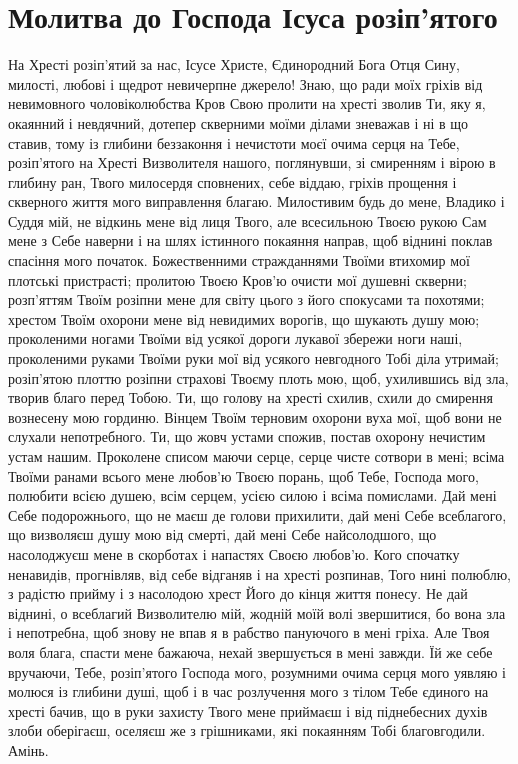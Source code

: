 \documentclass[chapters.tex]{subfiles}
\begin{document}
\section{Молитва до Господа Ісуса розіп’ятого}
На Хресті розіп’ятий за нас, Ісусе Христе, Єдинородний Бога Отця Сину, милості, любові і щедрот невичерпне джерело! Знаю, що ради моїх гріхів від невимовного чоловіколюбства Кров Свою пролити на хресті зволив Ти, яку я, окаянний і невдячний, дотепер скверними моїми ділами зневажав і ні в що ставив, тому із глибини беззаконня і нечистоти моєї очима серця на Тебе, розіп’ятого на Хресті Визволителя нашого, поглянувши, зі смиренням і вірою в глибину ран, Твого милосердя сповнених, себе віддаю, гріхів прощення і скверного життя мого виправлення благаю. Милостивим будь до мене, Владико і Суддя мій, не відкинь мене від лиця Твого, але всесильною Твоєю рукою Сам мене з Себе наверни і на шлях істинного покаяння направ, щоб віднині поклав спасіння мого початок. Божественними стражданнями Твоїми втихомир мої плотські пристрасті; пролитою Твоєю Кров’ю очисти мої душевні скверни; розп’яттям Твоїм розіпни мене для світу цього з його спокусами та похотями; хрестом Твоїм охорони мене від невидимих ворогів, що шукають душу мою; проколеними ногами Твоїми від усякої дороги лукавої збережи ноги наші, проколеними руками Твоїми руки мої від усякого невгодного Тобі діла утримай; розіп’ятою плоттю розіпни страхові Твоєму плоть мою, щоб, ухилившись від зла, творив благо перед Тобою. Ти, що голову на хресті схилив, схили до смирення вознесену мою гординю. Вінцем Твоїм терновим охорони вуха мої, щоб вони не слухали непотребного. Ти, що жовч устами спожив, постав охорону нечистим устам нашим. Проколене списом маючи серце, серце чисте сотвори в мені; всіма Твоїми ранами всього мене любов’ю Твоєю порань, щоб Тебе, Господа мого, полюбити всією душею, всім серцем, усією силою і всіма помислами. Дай мені Себе подорожнього, що не маєш де голови прихилити, дай мені Себе всеблагого, що визволяєш душу мою від смерті, дай мені Себе найсолодшого, що насолоджуєш мене в скорботах і напастях Своєю любов’ю. Кого спочатку ненавидів, прогнівляв, від себе відганяв і на хресті розпинав, Того нині полюблю, з радістю прийму і з насолодою хрест Його до кінця життя понесу. Не дай віднині, о всеблагий Визволителю мій, жодній моїй волі звершитися, бо вона зла і непотребна, щоб знову не впав я в рабство пануючого в мені гріха. Але Твоя воля блага, спасти мене бажаюча, нехай звершується в мені завжди. Їй же себе вручаючи, Тебе, розіп’ятого Господа мого, розумними очима серця мого уявляю і молюся із глибини душі, щоб і в час розлучення мого з тілом Тебе єдиного на хресті бачив, що в руки захисту Твого мене приймаєш і від піднебесних духів злоби оберігаєш, оселяєш же з грішниками, які покаянням Тобі благовгодили. Амінь.
\end{document}
